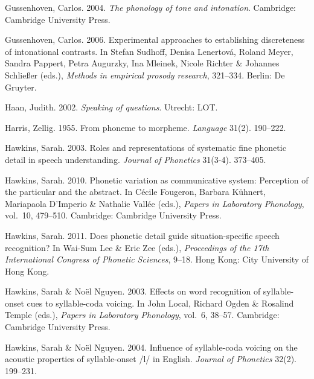 \documentclass[ number=1
,series=labphon
,output=long
,url=http://langsci-press.org/catalog/book/16
,isbn=978-3-944675-01-5
]{LSP/langsci}
\begin{document}
\begin{thebibliography}{284}
Gussenhoven, Carlos. 2004.
\newblock \emph{The phonology of tone and intonation}.
\newblock Cambridge: Cambridge University Press.

Gussenhoven, Carlos. 2006.
\newblock Experimental approaches to establishing discreteness of intonational
  contrasts.
\newblock In Stefan Sudhoff, Denisa Lenertov\'{a}, Roland Meyer, Sandra
  Pappert, Petra Augurzky, Ina Mleinek, Nicole Richter \& Johannes
  Schlie\ss{}er (eds.), \emph{Methods in empirical prosody research}, 321--334.
  Berlin: De Gruyter.

Haan, Judith. 2002.
\newblock \emph{Speaking of questions}.
\newblock Utrecht: LOT.

Harris, Zellig. 1955.
\newblock From phoneme to morpheme.
\newblock \emph{Language} 31(2). 190--222.

Hawkins, Sarah. 2003.
\newblock Roles and representations of systematic fine phonetic detail in
  speech understanding.
\newblock \emph{Journal of Phonetics} 31(3-4). 373--405.

Hawkins, Sarah. 2010.
\newblock Phonetic variation as communicative system: {P}erception of the
  particular and the abstract.
\newblock In C\'{e}cile Fougeron, Barbara K\"{u}hnert, Mariapaola D'Imperio \&
  Nathalie Vall\'{e}e (eds.), \emph{Papers in {L}aboratory {P}honology},
  vol.~10, 479--510. Cambridge: Cambridge University Press.

Hawkins, Sarah. 2011.
\newblock Does phonetic detail guide situation-specific speech recognition?
\newblock In Wai-Sum Lee \& Eric Zee (eds.), \emph{Proceedings of the 17th
  {I}nternational {C}ongress of {P}honetic {S}ciences}, 9--18. Hong Kong: City
  University of Hong Kong.

Hawkins, Sarah \& Noël Nguyen. 2003.
\newblock Effects on word recognition of syllable-onset cues to syllable-coda
  voicing.
\newblock In John Local, Richard Ogden \& Rosalind Temple (eds.), \emph{Papers
  in {L}aboratory {P}honology}, vol.~6, 38--57. Cambridge: Cambridge University
  Press.

Hawkins, Sarah \& Noël Nguyen. 2004.
\newblock Influence of syllable-coda voicing on the acoustic properties of
  syllable-onset /l/ in {E}nglish.
\newblock \emph{Journal of Phonetics} 32(2). 199--231.


\end{thebibliography}
\end{document}
